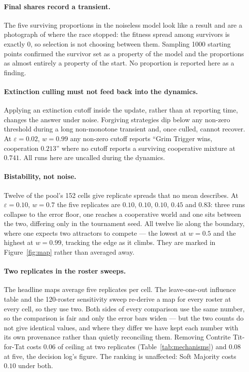 \documentclass[11pt,a4paper]{article}
\newcommand{\eps}{\varepsilon}
\begin{document}
\paragraph{Final shares record a transient.}
The five surviving proportions in the noiseless model look like a result and are
a photograph of where the race stopped: the fitness spread among survivors is
exactly $0$, so selection is not choosing between them. Sampling 1000 starting
points confirmed the survivor set as a property of the model and the proportions
as almost entirely a property of the start. No proportion is reported here as a
finding.

\paragraph{Extinction culling must not feed back into the dynamics.}
Applying an extinction cutoff inside the update, rather than at reporting time,
changes the answer under noise. Forgiving strategies dip below any non-zero
threshold during a long non-monotone transient and, once culled, cannot recover.
At $\eps = 0.02$, $w = 0.99$ any non-zero cutoff reports ``Grim Trigger wins,
cooperation $0.213$'' where no cutoff reports a surviving cooperative mixture at
$0.741$. All runs here are uncalled during the dynamics.

\paragraph{Bistability, not noise.}
Twelve of the pool's 152 cells give replicate spreads that no mean describes.
At $\eps = 0.10$, $w = 0.7$ the five replicates are $0.10$, $0.10$, $0.10$,
$0.45$ and $0.83$: three runs collapse to the error floor, one reaches a
cooperative world and one sits between the two, differing only in the tournament
seed. All twelve lie along
the boundary, where one expects two attractors to compete --- the lowest at
$w = 0.5$ and the highest at $w = 0.99$, tracking the edge as it climbs. They
are marked in Figure~\ref{fig:map} rather than averaged away.

\paragraph{Two replicates in the roster sweeps.}
The headline maps average five replicates per cell. The leave-one-out influence
table and the 120-roster sensitivity sweep re-derive a map for every roster at
every cell, so they use two. Both sides of every comparison use the same number,
so the comparison is fair and only the error bars widen --- but the two counts
do not give identical values, and where they differ we have kept each number
with its own provenance rather than quietly reconciling them. Removing Contrite
Tit-for-Tat costs $0.06$ of ceiling at two replicates (Table~\ref{tab:mechanisms})
and $0.08$ at five, the decision log's figure. The ranking is unaffected: Soft
Majority costs $0.10$ under both.
\end{document}
